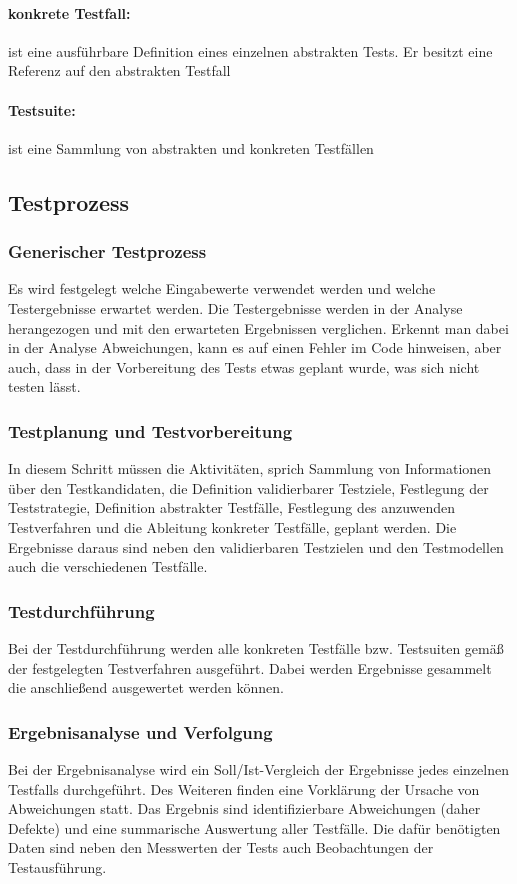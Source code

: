\paragraph{konkrete Testfall:} ist eine ausführbare Definition eines einzelnen abstrakten Tests. Er besitzt eine Referenz auf den abstrakten Testfall
\paragraph{Testsuite:} ist eine Sammlung von abstrakten und konkreten Testfällen

\subsection{Testprozess}
\subsubsection{Generischer Testprozess}
Es wird festgelegt welche Eingabewerte verwendet werden und welche Testergebnisse erwartet werden. Die Testergebnisse werden in der Analyse herangezogen und mit den erwarteten Ergebnissen verglichen. Erkennt man dabei in der Analyse Abweichungen, kann es auf einen Fehler im Code hinweisen, aber auch, dass in der Vorbereitung des Tests etwas geplant wurde, was sich nicht testen lässt. 

\subsubsection{Testplanung und Testvorbereitung}
In diesem Schritt müssen die Aktivitäten, sprich Sammlung von Informationen über den Testkandidaten, die Definition validierbarer Testziele, Festlegung der Teststrategie, Definition abstrakter Testfälle, Festlegung des anzuwenden Testverfahren und die Ableitung konkreter Testfälle, geplant werden.
Die Ergebnisse daraus sind neben den validierbaren Testzielen und den Testmodellen auch die verschiedenen Testfälle.

\subsubsection{Testdurchführung}
Bei der Testdurchführung werden alle konkreten Testfälle bzw. Testsuiten gemäß der festgelegten Testverfahren ausgeführt. Dabei werden Ergebnisse gesammelt die anschließend ausgewertet werden können.

\subsubsection{Ergebnisanalyse und Verfolgung}
Bei der Ergebnisanalyse wird ein Soll/Ist-Vergleich der Ergebnisse jedes einzelnen Testfalls durchgeführt. Des Weiteren finden eine Vorklärung der Ursache von Abweichungen statt. Das Ergebnis sind identifizierbare Abweichungen (daher Defekte) und eine summarische Auswertung aller Testfälle.
Die dafür benötigten Daten sind neben den Messwerten der Tests auch Beobachtungen der Testausführung.

